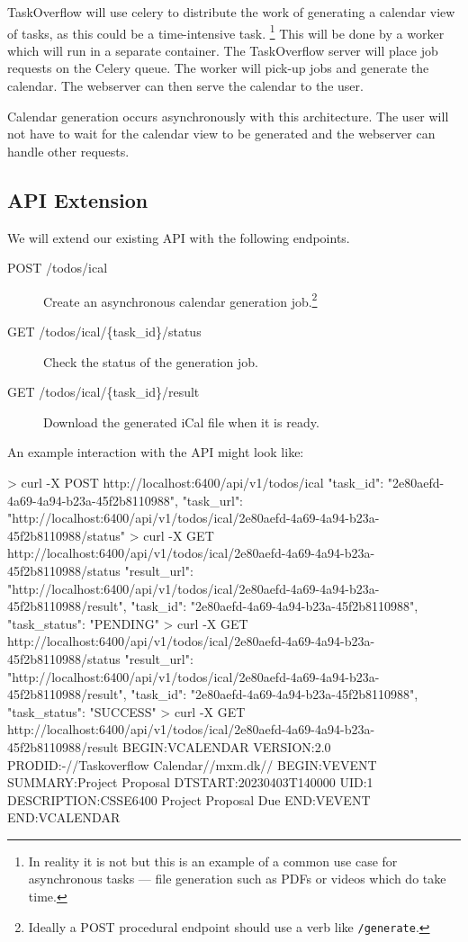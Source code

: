 \documentclass{csse4400}
\begin{document}
TaskOverflow will use celery to distribute the work of generating a calendar view of tasks,
as this could be a time-intensive task.%
\footnote{In reality it is not but this is an example of a common use case for asynchronous tasks --- file generation such as PDFs or videos which do take time.}
This will be done by a worker which will run in a separate container.
The TaskOverflow server will place job requests on the Celery queue.
The worker will pick-up jobs and generate the calendar.
The webserver can then serve the calendar to the user.

Calendar generation occurs asynchronously with this architecture.
The user will not have to wait for the calendar view to be generated and the webserver can handle other requests.

\subsection{API Extension}
\label{sect:apiext}

We will extend our existing API with the following endpoints.

\begin{description}
    \item[POST /todos/ical] Create an asynchronous calendar generation job.\footnote{Ideally a POST procedural endpoint should use a verb like \texttt{/generate}.}
    \item[GET /todos/ical/\{task\_id\}/status] Check the status of the generation job.
    \item[GET /todos/ical/\{task\_id\}/result] Download the generated iCal file when it is ready.
\end{description}

An example interaction with the API might look like:

\begin{code}[language=bash,numbers=none]{}
> curl -X POST http://localhost:6400/api/v1/todos/ical
{
  "task_id": "2e80aefd-4a69-4a94-b23a-45f2b8110988",
  "task_url": "http://localhost:6400/api/v1/todos/ical/2e80aefd-4a69-4a94-b23a-45f2b8110988/status"
}
> curl -X GET http://localhost:6400/api/v1/todos/ical/2e80aefd-4a69-4a94-b23a-45f2b8110988/status
{
  "result_url": "http://localhost:6400/api/v1/todos/ical/2e80aefd-4a69-4a94-b23a-45f2b8110988/result",
  "task_id": "2e80aefd-4a69-4a94-b23a-45f2b8110988",
  "task_status": "PENDING"
}
> curl -X GET http://localhost:6400/api/v1/todos/ical/2e80aefd-4a69-4a94-b23a-45f2b8110988/status
{
  "result_url": "http://localhost:6400/api/v1/todos/ical/2e80aefd-4a69-4a94-b23a-45f2b8110988/result",
  "task_id": "2e80aefd-4a69-4a94-b23a-45f2b8110988",
  "task_status": "SUCCESS"
}
> curl -X GET http://localhost:6400/api/v1/todos/ical/2e80aefd-4a69-4a94-b23a-45f2b8110988/result
BEGIN:VCALENDAR
VERSION:2.0
PRODID:-//Taskoverflow Calendar//mxm.dk//
BEGIN:VEVENT
SUMMARY:Project Proposal
DTSTART:20230403T140000
UID:1
DESCRIPTION:CSSE6400 Project Proposal Due
END:VEVENT
END:VCALENDAR
\end{code}
\end{document}
